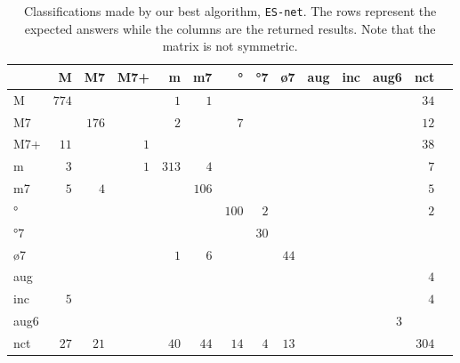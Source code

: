 \documentclass{article}
\begin{document}
\begin{table*}
\centering
\begin{tabular}{l||r|r|r|r|r|r|r|r|r|r|r|r|r}
      &     M &    M7 &   M7+ &     m &    m7 &    ° &   °7 &   ø7 &   aug &   inc &  aug6 &   nct \\  \hline \hline
    M & $ 774 $ & $     $ & $     $ & $   1 $ & $   1 $ & $     $ & $     $ & $     $ & $     $ & $     $ & $     $ & $  34 $ \\ \hline
   M7 & $     $ & $ 176 $ & $     $ & $   2 $ & $     $ & $   7 $ & $     $ & $     $ & $     $ & $     $ & $     $ & $  12 $ \\ \hline
  M7+ & $  11 $ & $     $ & $   1 $ & $     $ & $     $ & $     $ & $     $ & $     $ & $     $ & $     $ & $     $ & $  38 $ \\ \hline
    m & $   3 $ & $     $ & $   1 $ & $ 313 $ & $   4 $ & $     $ & $     $ & $     $ & $     $ & $     $ & $     $ & $   7 $ \\ \hline
   m7 & $   5 $ & $   4 $ & $     $ & $     $ & $ 106 $ & $     $ & $     $ & $     $ & $     $ & $     $ & $     $ & $   5 $ \\ \hline
   ° & $     $ & $     $ & $     $ & $     $ & $     $ & $ 100 $ & $   2 $ & $     $ & $     $ & $     $ & $     $ & $   2 $ \\ \hline
  °7 & $     $ & $     $ & $     $ & $     $ & $     $ & $     $ & $  30 $ & $     $ & $     $ & $     $ & $     $ & $     $ \\ \hline
  ø7 & $     $ & $     $ & $     $ & $   1 $ & $   6 $ & $     $ & $     $ & $  44 $ & $     $ & $     $ & $     $ & $     $ \\ \hline
  aug & $     $ & $     $ & $     $ & $     $ & $     $ & $     $ & $     $ & $     $ & $     $ & $     $ & $     $ & $   4 $ \\ \hline
  inc & $   5 $ & $     $ & $     $ & $     $ & $     $ & $     $ & $     $ & $     $ & $     $ & $     $ & $     $ & $   4 $ \\ \hline
 aug6 & $     $ & $     $ & $     $ & $     $ & $     $ & $     $ & $     $ & $     $ & $     $ & $     $ & $   3 $ & $     $ \\ \hline
  nct & $  27 $ & $  21 $ & $     $ & $  40 $ & $  44 $ & $  14 $ & $   4 $ & $  13 $ & $     $ & $     $ & $     $ & $ 304 $ \\ \hline
\end{tabular}
\caption{Classifications made by our best algorithm, \texttt{ES-net}. The rows represent
  the expected answers while the columns are the returned
  results. Note that the matrix is not symmetric.}
\label{tab:erros-ES-net}
\end{table*}
\end{document}
